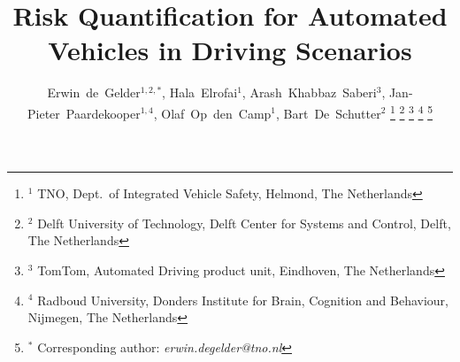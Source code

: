 \documentclass[journal]{IEEEtran}
\begin{document}
\date{}

\title{Risk Quantification for Automated Vehicles in Driving Scenarios}

\author{Erwin~de~Gelder$^{1,2,*}$,
	    Hala~Elrofai$^{1}$,
	    Arash~Khabbaz~Saberi$^{3}$,
	    Jan-Pieter~Paardekooper$^{1,4}$,
	    Olaf~Op~den~Camp$^{1}$,
	    Bart~De~Schutter$^{2}$%
\thanks{$^1$ TNO, Dept.\ of Integrated Vehicle Safety, Helmond, The Netherlands}%
\thanks{$^2$ Delft University of Technology, Delft Center for Systems and Control, Delft, The Netherlands}%
\thanks{$^3$ TomTom, Automated Driving product unit, Eindhoven, The Netherlands}%
\thanks{$^4$ Radboud University, Donders Institute for Brain, Cognition and Behaviour, Nijmegen, The Netherlands}%
\thanks{$^*$ Corresponding author: \textit{erwin.degelder@tno.nl}}}%

\maketitle

\acresetall





\acresetall





\printbibliography
\end{document}
